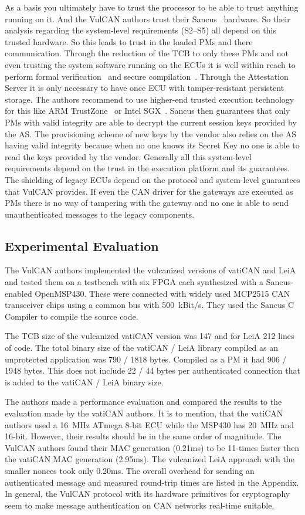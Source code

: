 As a basis you ultimately have to trust the processor to be able to trust
anything running on it. And the VulCAN authors trust their Sancus~\cite{Noorman}
hardware. So their analysis regarding the system-level requirements (S2--S5) all
depend on this trusted hardware. So this leads to trust in the loaded PMs and
there communication. Through the reduction of the TCB to only these PMs and not
even trusting the system software running on the ECUs it is well within reach to
perform formal verification~\cite{Philippaerts2014} and secure
compilation~\cite{Patrignani2015}. Through the Attestation Server it is only
necessary to have once ECU with tamper-resistant persistent storage. The authors
recommend to use higher-end trusted execution technology for this like ARM
TrustZone~\cite{Alves2004} or Intel SGX~\cite{McKeen2013}. Sancus then
guarantees that only PMs with valid integrity are able to decrypt the current
session keys provided by the AS\@. The provisioning scheme of new keys by the
vendor also relies on the AS having valid integrity because when no one knows
its Secret Key no one is able to read the keys provided by the vendor. Generally all
this system-level requirements depend on the trust in the execution platform and
its guarantees. The shielding of legacy ECUs depend on the protocol and
system-level guarantees that VulCAN provides. If even the CAN driver for the
gateways are executed as PMs there is no way of tampering with the gateway and
no one is able to send unauthenticated messages to the legacy components.

\subsection{Experimental Evaluation}\label{subsec:experimental_evaluation}

The VulCAN authors implemented the vulcanized versions of vatiCAN and LeiA and tested them on a testbench with six FPGA each synthesized with a Sancus-enabled OpenMSP430. These were connected with widely used MCP2515 CAN transceiver chips using a common bus with 500~kBit/s. They used the Sancus C Compiler to compile the source code.

The TCB size of the vulcanized vatiCAN version was 147 and for LeiA 212 lines of code. The total binary size of the vatiCAN / LeiA library compiled as an unprotected application was 790 / 1818 bytes. Compiled as a PM it had 906 / 1948 bytes. This does not include 22 / 44 bytes per authenticated connection that is added to the vatiCAN / LeiA binary size.

The authors made a performance evaluation and compared the results to the evaluation made by
the vatiCAN authors. It is to mention, that the vatiCAN authors used a 16~MHz
ATmega 8-bit ECU while the MSP430 has 20~MHz and 16-bit. However, their results
should be in the same order of magnitude. The VulCAN authors found their MAC
generation (0.21ms) to be 11-times faster then the vatiCAN MAC generation
(2.95ms). The vulcanized LeiA approach with the smaller nonces took only 0.20ms.
The overall overhead for sending an authenticated message and measured
round-trip times are listed in the Appendix. In general, the VulCAN protocol with its hardware primitives for cryptography seem to make message authentication on CAN networks real-time suitable.
